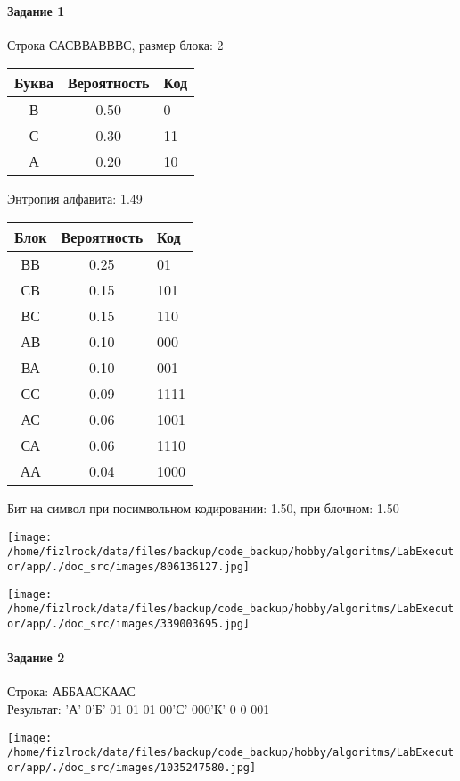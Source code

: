 \documentclass[a4paper, 12pt]{article}
\begin{document}
\paragraph{Задание 1}

Строка САСВВАВВВС, размер блока: 2
\begin{center}
 \begin{tabular}{ |c|c|l| } 
  \hline
     Буква & Вероятность & Код\\ \hline
В & 0.50 & 0\\\hline
С & 0.30 & 11\\\hline
А & 0.20 & 10
\\ \hline \end{tabular}
\end{center}
Энтропия алфавита: 1.49
\begin{center}
 \begin{tabular}{ |c|c|l| } 
  \hline
     Блок & Вероятность & Код\\ \hline
ВВ & 0.25 & 01\\\hline
СВ & 0.15 & 101\\\hline
ВС & 0.15 & 110\\\hline
АВ & 0.10 & 000\\\hline
ВА & 0.10 & 001\\\hline
СС & 0.09 & 1111\\\hline
АС & 0.06 & 1001\\\hline
СА & 0.06 & 1110\\\hline
АА & 0.04 & 1000
\\ \hline \end{tabular}
\end{center}
Бит на символ при посимвольном кодировании: 1.50, при блочном: 1.50

\texttt{[image: /home/fizlrock/data/files/backup/code\_backup/hobby/algoritms/LabExecutor/app/./doc\_src/images/806136127.jpg]}

\texttt{[image: /home/fizlrock/data/files/backup/code\_backup/hobby/algoritms/LabExecutor/app/./doc\_src/images/339003695.jpg]}
\pagebreak
\paragraph{Задание 2}

Строка: 
АББААСКААС\\
Результат: 'А' 0'Б' 01 01 01 00'С' 000'К' 0 0 001

\texttt{[image: /home/fizlrock/data/files/backup/code\_backup/hobby/algoritms/LabExecutor/app/./doc\_src/images/1035247580.jpg]}
\end{document}

